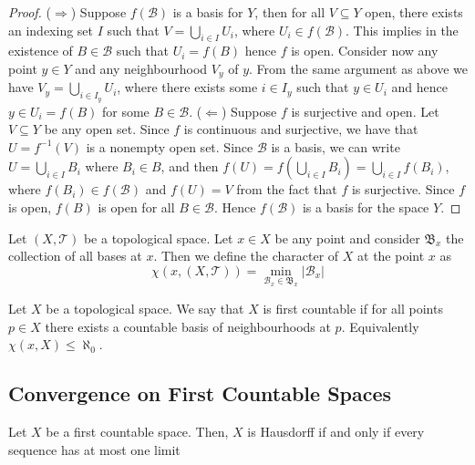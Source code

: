 \begin{proof}
  (\(\Rightarrow\)) Suppose \(f(\mathcal B)\) is a basis for \(Y\), then for all
  \(V \subseteq Y\) open, there exists an indexing set \(I\) such that \(V =
  \bigcup_{i \in  I} U_i\), where \(U_i \in f(\mathcal B)\). This implies in the
  existence of \(B \in \mathcal B\) such that \(U_i = f(B)\) hence \(f\) is
  open. Consider now any point \(y \in Y\) and any neighbourhood \(V_y\) of
  \(y\). From the same argument as above we have \(V_y = \bigcup_{i \in  I_y}
  U_i\), where there exists some \(i \in I_y\) such that \(y \in U_i\) and hence
  \(y \in U_i = f(B)\) for some \(B \in \mathcal B\).
  (\(\Leftarrow\)) Suppose \(f\) is surjective and open. Let \(V \subseteq Y\)
  be any open set. Since \(f\) is continuous and surjective, we have that
  \(U = f^{-1}(V)\) is a nonempty open set. Since \(\mathcal B\) is a basis, we
  can write \(U = \bigcup_{i \in  I} B_i\) where \(B_i \in B\), and then \(f(U)
  = f\left( \bigcup_{i \in  I} B_i \right) = \bigcup_{i \in I} f(B_i)\), where
  \(f(B_i) \in f(\mathcal B)\) and \(f(U) = V\) from the fact that \(f\) is
  surjective. Since \(f\) is open, \(f(B)\) is open for all \(B \in \mathcal
  B\). Hence \(f(\mathcal B)\) is a basis for the space \(Y\).
\end{proof}

\begin{definition}\label{def: character}
  Let \((X, \mathcal T)\) be a topological space. Let \(x \in X\) be any point
  and consider \(\mathfrak B_x\) the collection of all bases at \(x\). Then we
  define the character of \(X\) at the point \(x\) as
  \[
    \chi(x, (X, \mathcal T)) = \min_{\mathcal B_x \in \mathfrak B_x} |\mathcal
    B_x|
  \]
\end{definition}

\begin{definition}\label{def: first countable}
  Let \(X\) be a topological space. We say that \(X\) is first countable if for
  all points \(p \in X\) there exists a countable basis of neighbourhoods at
  \(p\). Equivalently \(\chi(x, X) \leq \aleph_0\).
\end{definition}

\subsection{Convergence on First Countable Spaces}

\begin{proposition}
  Let \(X\) be a first countable space. Then, \(X\) is Hausdorff if and only if
  every sequence has at most one limit
\end{proposition}

